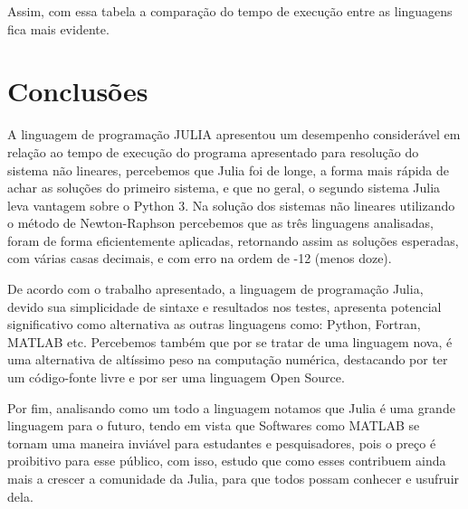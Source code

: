 \documentclass[a4paper, 12pt, openright, oneside]{article}
\begin{document}
Assim, com essa tabela a comparação do tempo de execução entre as linguagens fica mais evidente.

\newpage

\section{Conclusões}

A linguagem de programação JULIA apresentou um desempenho considerável em relação ao tempo de execução do programa apresentado para resolução do sistema não lineares, percebemos que Julia foi de longe, a forma mais rápida de achar as soluções do primeiro sistema, e que no geral, o segundo sistema Julia leva vantagem sobre o Python 3. Na solução dos sistemas não lineares utilizando o método de Newton-Raphson percebemos que as três linguagens analisadas, foram de forma eficientemente aplicadas, retornando assim as soluções esperadas, com várias casas decimais, e com erro na ordem de -12 (menos doze). 

De acordo com o trabalho apresentado, a linguagem de programação Julia, devido sua simplicidade de sintaxe e resultados nos testes, apresenta potencial significativo como alternativa as outras linguagens como: Python, Fortran, MATLAB etc. Percebemos também que por se tratar de uma linguagem nova, é uma alternativa de altíssimo peso na computação numérica, destacando por ter um código-fonte livre e por ser uma linguagem Open Source. 

Por fim, analisando como um todo a linguagem notamos que Julia é uma grande linguagem para o futuro, tendo em vista que Softwares como MATLAB se tornam uma maneira inviável para estudantes e pesquisadores, pois o preço é proibitivo para esse público, com isso, estudo que como esses contribuem ainda mais a crescer a comunidade da Julia, para que todos possam conhecer e usufruir dela.


\newpage




\nocite{associaccao1989nbr}
\nocite{marconi2003fundamentos}



\end{document}
